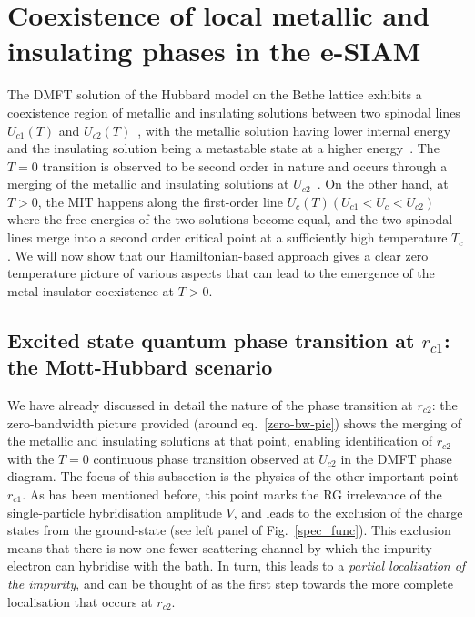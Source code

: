 \section{Coexistence of local metallic and insulating phases in the e-SIAM}
\label{dmft}

The DMFT solution of the Hubbard model on the Bethe lattice exhibits a coexistence region of metallic and insulating solutions between two spinodal lines \(U_{c1}(T)\) and \(U_{c2}(T)\)~\cite{georges1996}, with the metallic solution having lower internal energy and the insulating solution being a metastable state at a higher energy~\cite{moeller_1995,georges1996,bulla_1999,georges_2004_dmft,georges_krauth_1993}.
The \(T=0\) transition is observed to be second order in nature and occurs through a merging of the metallic and insulating solutions at \(U_{c2}\)~\cite{rozenberg_1994_zerotemp,moeller_1995}. On the other hand, at $T>0$, the MIT happens along the first-order line \(U_c(T) \left(U_{c1} < U_c <U_{c2} \right)\) where the free energies of the two solutions become equal, and the two spinodal lines merge into a second order critical point at a sufficiently high temperature \(T_c\).  
We will now show that our Hamiltonian-based approach gives a clear zero temperature picture of various aspects that can lead to the emergence of the metal-insulator coexistence at $T>0$.

\subsection{Excited state quantum phase transition at \(r_{c1}\): the Mott-Hubbard scenario}

We have already discussed in detail the nature of the phase transition at \(r_{c2}\): the zero-bandwidth picture provided (around eq.~\eqref{zero-bw-pic}) shows the merging of the metallic and insulating solutions at that point, enabling identification of \(r_{c2}\) with the $T=0$ continuous phase transition observed at \(U_{c2}\) in the DMFT phase diagram. The focus of this subsection is the physics of the other important point \(r_{c1}\). As has been mentioned before, this point marks the RG irrelevance of the single-particle hybridisation amplitude \(V\), and leads to the exclusion of the charge states from the ground-state (see left panel of Fig.~\eqref{spec_func}). This exclusion means that there is now one fewer scattering channel by which the impurity electron can hybridise with the bath. In turn, this leads to a {\it partial localisation of the impurity}, and can be thought of as the first step towards the more complete localisation that occurs at \(r_{c2}\).

